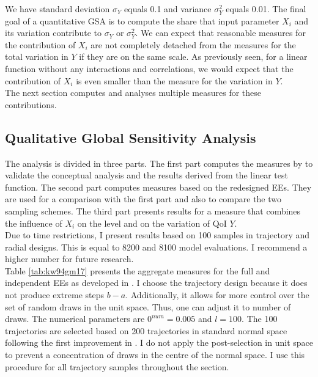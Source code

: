 \noindent
We have standard deviation $\sigma_Y$ equals 0.1 and variance $\sigma_Y^2$ equals 0.01. The final goal of a quantitative GSA is to compute the share that input parameter $X_i$ and its variation contribute to $\sigma_Y$ or $\sigma_Y^2$. We can expect that reasonable measures for the contribution of $X_i$ are not completely detached from the measures for the total variation in $Y$ if they are on the same scale. As previously seen, for a linear function without any interactions and correlations, we would expect that the contribution of $X_i$ is even smaller than the measure for the variation in $Y$.\\


\noindent
The next section computes and analyses multiple measures for these contributions.


\subsection{Qualitative Global Sensitivity Analysis}

The analysis is divided in three parts. The first part computes the measures by \cite{ge2017extending} to validate the conceptual analysis and the results derived from the linear test function. The second part computes measures based on the redesigned EEs. They are used for a comparison with the first part and also to compare the two sampling schemes. The third part presents results for a measure that combines the influence of $X_i$ on the level and on the variation of QoI $Y$.\\

\noindent
Due to time restrictions, I present results based on 100 samples in trajectory and radial designs. This is equal to 8200 and 8100 model evaluations. I recommend a higher number for future research.\\

\noindent
Table \ref{tab:kw94gm17} presents the aggregate measures for the full and independent EEs as developed in \cite{ge2014efficient}. I choose the trajectory design because it does not produce extreme steps $b-a$. Additionally, it allows for more control over the set of random draws in the unit space. Thus, one can adjust it to number of draws. The numerical parameters are $0^{num}=0.005$ and $l=100$. The 100 trajectories are selected based on 200 trajectories in standard normal space following the first improvement in \cite{ge2014efficient}. I do not apply the post-selection in unit space to prevent a concentration of draws in the centre of the normal space. I use this procedure for all trajectory samples throughout the section.\\

